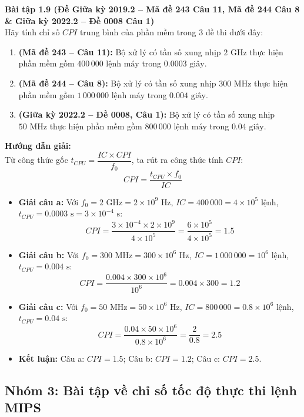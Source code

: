\textbf{Bài tập 1.9 (Đề Giữa kỳ 2019.2 -- Mã đề 243 Câu 11, Mã đề 244 Câu 8 \& Giữa kỳ 2022.2 -- Đề 0008 Câu 1)}\\
Hãy tính chỉ số $CPI$ trung bình của phần mềm trong 3 đề thi dưới đây:
\begin{enumerate}[label=\alph*)]
    \item \textbf{(Mã đề 243 -- Câu 11):} Bộ xử lý có tần số xung nhịp $2\text{ GHz}$ thực hiện phần mềm gồm $400\,000\text{ lệnh máy}$ trong $0.0003\text{ giây}$.
    \item \textbf{(Mã đề 244 -- Câu 8):} Bộ xử lý có tần số xung nhịp $300\text{ MHz}$ thực hiện phần mềm gồm $1\,000\,000\text{ lệnh máy}$ trong $0.004\text{ giây}$.
    \item \textbf{(Giữa kỳ 2022.2 -- Đề 0008, Câu 1):} Bộ xử lý có tần số xung nhịp $50\text{ MHz}$ thực hiện phần mềm gồm $800\,000\text{ lệnh máy}$ trong $0.04\text{ giây}$.
\end{enumerate}
\textbf{Hướng dẫn giải:}\\
Từ công thức gốc $t_{CPU} = \dfrac{IC \times CPI}{f_0}$, ta rút ra công thức tính $CPI$:
$$CPI = \frac{t_{CPU} \times f_0}{IC}$$
\begin{itemize}
    \item \textbf{Giải câu a:} Với $f_0 = 2\text{ GHz} = 2 \times 10^9\text{ Hz}$, $IC = 400\,000 = 4 \times 10^5\text{ lệnh}$, $t_{CPU} = 0.0003\text{ s} = 3 \times 10^{-4}\text{ s}$:
    $$CPI = \frac{3 \times 10^{-4} \times 2 \times 10^9}{4 \times 10^5} = \frac{6 \times 10^5}{4 \times 10^5} = 1.5$$
    \item \textbf{Giải câu b:} Với $f_0 = 300\text{ MHz} = 300 \times 10^6\text{ Hz}$, $IC = 1\,000\,000 = 10^6\text{ lệnh}$, $t_{CPU} = 0.004\text{ s}$:
    $$CPI = \frac{0.004 \times 300 \times 10^6}{10^6} = 0.004 \times 300 = 1.2$$
    \item \textbf{Giải câu c:} Với $f_0 = 50\text{ MHz} = 50 \times 10^6\text{ Hz}$, $IC = 800\,000 = 0.8 \times 10^6\text{ lệnh}$, $t_{CPU} = 0.04\text{ s}$:
    $$CPI = \frac{0.04 \times 50 \times 10^6}{0.8 \times 10^6} = \frac{2}{0.8} = 2.5$$
    \item \textbf{Kết luận:} Câu a: $CPI = 1.5$; Câu b: $CPI = 1.2$; Câu c: $CPI = 2.5$.
\end{itemize}

\subsection{Nhóm 3: Bài tập về chỉ số tốc độ thực thi lệnh MIPS}

